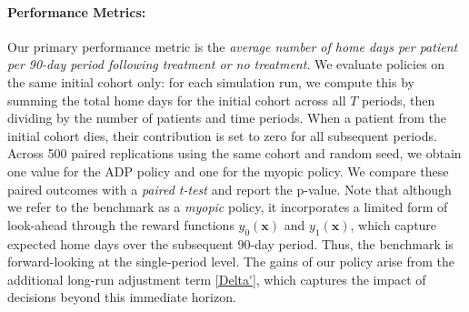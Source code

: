 \documentclass[12pt,a4paper]{article}
\begin{document}
\paragraph{\bf Performance Metrics:} Our primary performance metric is the \textit{average number of home days per patient per 90-day period following treatment or no treatment}. We evaluate policies on the same initial cohort only: for each simulation run, we compute this by summing the total home days for the initial cohort across all $T$ periods, then dividing by the number of patients and time periods. When a patient from the initial cohort dies, their contribution is set to zero for all subsequent periods.
Across 500 paired replications using the same cohort and random seed, we obtain one value for the ADP policy and one for the myopic policy. We compare these paired outcomes with a \textit{paired t-test} and report the p-value.
Note that although we refer to the benchmark as a \textit{myopic} policy, it incorporates a limited form of look-ahead through the reward functions $y_0(\mathbf{x})$ and $y_1(\mathbf{x})$, which capture expected home days over the subsequent 90-day period. Thus, the benchmark is forward-looking at the single-period level. The gains of our policy arise from the additional long-run adjustment term \eqref{Delta'}, which captures the impact of decisions beyond this immediate horizon.





\end{document}
